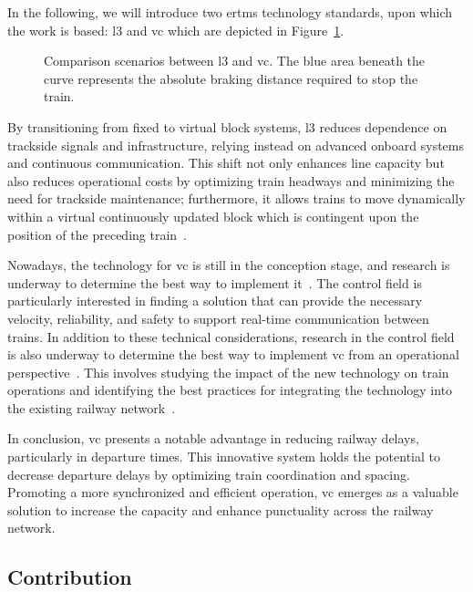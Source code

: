 In the following, we will introduce two \gls{ertms} technology standards, upon which the work is based: \gls{l3} and \gls{vc} which are depicted in Figure~\ref{fig:ertmsl3vc}.
\begin{figure}[h]
	\resizebox{\linewidth}{!}{}
	\caption{Comparison scenarios between \gls{l3} and \gls{vc}.
		The blue area beneath the curve represents the absolute braking distance required to stop the train.}
	\label{fig:ertmsl3vc}
\end{figure} 

By transitioning from fixed to virtual block systems, \gls{l3} reduces dependence on trackside signals and infrastructure, relying instead on advanced onboard systems and continuous  communication. This shift not only enhances line capacity but also reduces operational costs by optimizing train headways and minimizing the need for trackside maintenance; furthermore, it allows trains to move dynamically within a virtual continuously updated block which  is contingent upon the position of the preceding train~\cite{ertmsl3}.  




Nowadays, the technology for \gls{vc} is still in the conception stage, and research is underway to determine the best way to implement it~\cite{flamini2018}. The control field is particularly interested in finding a solution that can provide the necessary velocity, reliability, and safety to support real-time communication between trains. In addition to these technical considerations, research in the control field is also underway to determine the best way to implement \gls{vc} from an operational perspective~\cite{dimeo2020}. This involves studying the impact of the new technology on train operations and identifying the best practices for integrating the technology into the existing railway network~\cite{ertmsl4}.


In conclusion, \gls{vc} presents a notable advantage in reducing railway delays, particularly in departure times. This innovative system holds the potential to decrease departure delays by optimizing train coordination and spacing. Promoting a more synchronized and efficient operation, \gls{vc} emerges as a valuable solution to increase the capacity and enhance punctuality across the railway network.
%


%
\subsection{Contribution}
\label{subsec:contribution}
%


